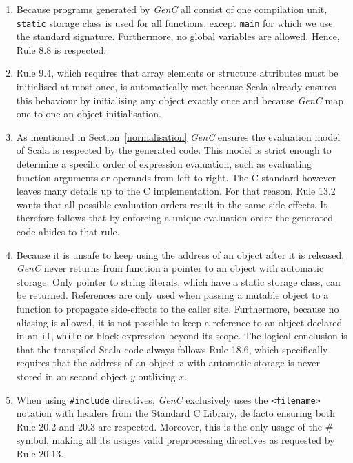 \documentclass[a4paper,twoside]{article}
\newcommand{\InlineC}[1]{\lstinline[language=C99]|#1|}
\newcommand{\GenC}{\emph{GenC}\xspace}
\newcommand{\RefSec}[1]{Section~\ref{#1}}
\begin{document}
\begin{enumerate}
\item Because programs generated by \GenC all consist of one compilation unit,
\InlineC{static} storage class is used for all functions, except \InlineC{main}
for which we use the standard signature. Furthermore, no global variables are
allowed. Hence, Rule 8.8 is respected.

\item Rule 9.4, which requires that array elements or structure attributes must
be initialised at most once, is automatically met because Scala already ensures
this behaviour by initialising any object exactly once and because \GenC map
one-to-one an object initialisation.

\item As mentioned in \RefSec{normalisation} \GenC ensures the evaluation model
of Scala is respected by the generated code. This model is strict enough to
determine a specific order of expression evaluation, such as evaluating function
arguments or operands from left to right. The C standard however leaves many
details up to the C implementation. For that reason, Rule 13.2 wants that all
possible evaluation orders result in the same side-effects. It therefore follows
that by enforcing a unique evaluation order the generated code abides to that
rule.

\item Because it is unsafe to keep using the address of an object after it is
released, \GenC never returns from function a pointer to an object with automatic
storage. Only pointer to string literals, which have a static storage class, can
be returned. References are only used when passing a mutable object to a
function to propagate side-effects to the caller site. Furthermore, because no
aliasing is allowed, it is not possible to keep a reference to an object
declared in an \InlineC{if}, \InlineC{while} or block expression beyond its
scope. The logical conclusion is that the transpiled Scala code always follows
Rule 18.6, which specifically requires that the address of an object $x$ with
automatic storage is never stored in an second object $y$ outliving $x$.

\item When using \InlineC{#include} directives, \GenC exclusively uses the
\InlineC{<filename>} notation with headers from the Standard C Library, de facto
ensuring both Rule 20.2 and 20.3 are respected. Moreover, this is the only usage
of the $\#$ symbol, making all its usages valid preprocessing directives as
requested by Rule 20.13.


\end{enumerate}
\end{document}
